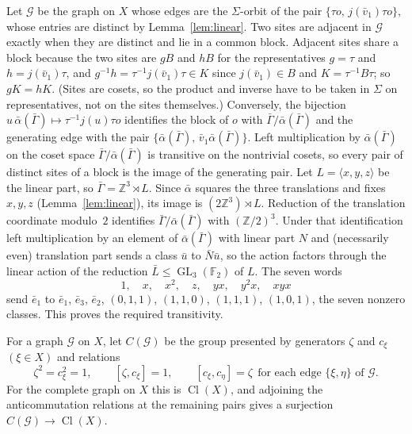 \documentclass[11pt]{amsart}
\newcommand{\leanverified}[2]{\ignorespaces}
\theoremstyle{definition}
\theoremstyle{remark}
\theoremstyle{plain}
\newcommand{\Z}{\mathbb Z}
\newcommand{\GL}{\operatorname{GL}}
\newcommand{\Cl}{\operatorname{Cl}}
\begin{document}
Let $\mathcal G$ be the graph on $X$ whose edges are the $\Sigma$-orbit
of the pair $\{\tau o,\,j(\bar v_1)\tau o\}$, whose entries are
distinct by Lemma~\ref{lem:linear}.  Two sites are adjacent in
$\mathcal G$ exactly when they are distinct and lie in a common block.
Adjacent sites share a block because the two sites are $gB$ and $hB$
for the representatives $g=\tau$ and $h=j(\bar v_1)\tau$, and
$g^{-1}h=\tau^{-1}j(\bar v_1)\tau\in K$ since $j(\bar v_1)\in B$ and
$K=\tau^{-1}B\tau$; so $gK=hK$.  (Sites are cosets, so the product
and inverse have to be taken in $\Sigma$ on representatives, not on the
sites themselves.)  Conversely, the bijection
$u\,\bar\alpha(\bar\Gamma)\mapsto\tau^{-1}j(u)\tau o$ identifies the
block of $o$ with $\bar\Gamma/\bar\alpha(\bar\Gamma)$ and the
generating edge with the pair
$\{\bar\alpha(\bar\Gamma),\,\bar v_1\bar\alpha(\bar\Gamma)\}$.  Left
multiplication by $\bar\alpha(\bar\Gamma)$ on the coset space
$\bar\Gamma/\bar\alpha(\bar\Gamma)$ is transitive on the nontrivial
cosets, so every pair of distinct sites of a block is the image of
the generating pair.  Let $L=\langle x,y,z\rangle$ be the linear part,
so $\bar\Gamma=\Z^3\rtimes L$.  Since $\bar\alpha$ squares the three
translations and fixes $x,y,z$ (Lemma~\ref{lem:linear}), its image is
$(2\Z^3)\rtimes L$.  Reduction of the translation coordinate modulo~$2$
identifies $\bar\Gamma/\bar\alpha(\bar\Gamma)$ with $(\Z/2)^3$.
Under that identification left multiplication by an
element of $\bar\alpha(\bar\Gamma)$ with linear part $N$ and
(necessarily even) translation part sends a class $\bar u$ to
$\bar N\bar u$, so the action factors through the linear action of the
reduction $\bar L\le\GL_3(\mathbb F_2)$ of $L$.  The seven words
\[
 1,\quad x,\quad x^2,\quad z,\quad yx,\quad y^2x,\quad xyx
\]
send $\bar e_1$ to
$\bar e_1$, $\bar e_3$, $\bar e_2$, $(0,1,1)$, $(1,1,0)$, $(1,1,1)$,
$(1,0,1)$, the seven nonzero classes.  This proves the required
transitivity.
\leanverified{Sofic/LiteralAffineCosetTransitivity}{GroupApproximation.LiteralAffineCosetTransitivity.conjD_cosetTransitive}

For a graph $\mathcal G$ on $X$, let $C(\mathcal G)$ be the group
presented by generators $\zeta$ and $c_\xi$ $(\xi\in X)$ and relations
\[
 \zeta^2=c_\xi^2=1,\qquad [\zeta,c_\xi]=1,\qquad
 [c_\xi,c_\eta]=\zeta\ \ \text{for each edge }\{\xi,\eta\}
 \text{ of }\mathcal G .
\]
For the complete graph on $X$ this is $\Cl(X)$, and adjoining the anticommutation
relations at the remaining pairs gives a surjection
$C(\mathcal G)\to\Cl(X)$.
\end{document}

